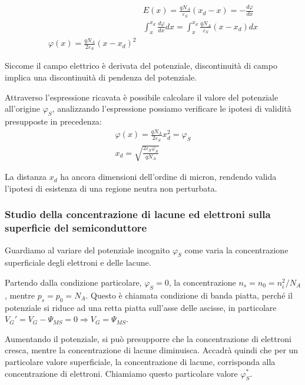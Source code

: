 \documentclass[../template]{subfiles}
\begin{document}
\begin{align*}
    &E(x) = \frac{q N_A}{\varepsilon_S} (x_d - x) = - \frac{d\varphi}{dx}
    \\
    &\int_x^{x_d} \frac{d\varphi}{dx}{dx} = \int_x^{x_d} \frac{qN_A}{\varepsilon_S}(x - x_d) dx
    \\
    \varphi(x) = \frac{q N_A} {2 \varepsilon_S} {(x - x_d)}^2
\end{align*}

Siccome il campo elettrico è derivata del potenziale, discontinuità di campo implica una discontinuità di pendenza del potenziale.

Attraverso l'espressione ricavata è possibile calcolare il valore del potenziale all'origine $\varphi_S$, analizzando l'espressione possiamo verificare le ipotesi di validità presupposte in precedenza:
\begin{align*}
    \varphi(x) = \frac{q N_A}{2 \varepsilon_S} x_d^2 = \varphi_S
    \\
    x_d = \sqrt{\frac{2 \varepsilon_S \varphi_S}{qN_A}}
\end{align*}

La distanza $x_d$ ha ancora dimensioni dell'ordine di micron, rendendo valida l'ipotesi di esistenza di una regione neutra non perturbata.

\subsubsection{Studio della concentrazione di lacune ed elettroni sulla superficie del semiconduttore}


Guardiamo al variare del potenziale incognito $\varphi_S$ come varia la concentrazione superficiale degli elettroni e delle lacune.

Partendo dalla condizione particolare, $\varphi_S = 0$, la concentrazione $n_s = n_0 = n_i^2 / N_A$, mentre $p_s = p_0 = N_A$.
Questo è chiamata condizione di banda piatta, perché il potenziale si riduce ad una retta piatta sull'asse delle ascisse, in particolare $V_G' = V_G - \Psi_{MS} = 0 \Rightarrow V_G = \Psi_{MS}$.

Aumentando il potenziale, si può presupporre che la concentrazione di elettroni cresca, mentre la concentrazione di lacune diminuisca.
Accadrà quindi che per un particolare valore superficiale, la concentrazione di lacune, corrisponda alla concentrazione di elettroni. Chiamiamo questo particolare valore $\varphi_S^*$.
\end{document}

